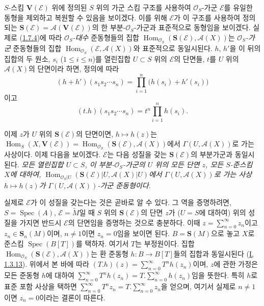 \begin{env}[1.7.14]
\label{II.1.7.14-ko}
$S$-스킴 $\mathbf{V}(\mathcal{E})$ 위에 정의된 $S$ 위의 가군 스킴
구조를 사용하여 $\mathcal{O}_S$-가군 $\mathcal{E}$를 유일한 동형을
제외하고 복원할 수 있음을 보이겠다. 이를 위해 $\mathcal{E}$가 이
구조를 사용하여 정의되는
$\mathbf{S}(\mathcal{E})=\mathcal{A}(\mathbf{V}(\mathcal{E}))$의 한
부분-$\mathcal{O}_S$-가군과 표준적으로 동형임을 보이겠다. 실제로
(\hyperref[II.1.7.4-ko]{1.7.4})에 따라
\emph{$\mathcal{O}_S$-대수} 준동형들의 집합
$\operatorname{Hom}_{\mathcal{O}_S}(\mathbf{S}(\mathcal{E}),
\mathcal{A}(X))$는 \emph{$\mathcal{O}_S$-가군} 준동형들의 집합
$\operatorname{Hom}_{\mathcal{O}_S}(\mathcal{E},\mathcal{A}(X))$와
표준적으로 동일시된다. $h$, $h'$을 이 뒤의 집합의 두 원소,
$s_i$ ($1\leq i\leq n$)를 열린집합 $U\subset S$ 위의
$\mathcal{E}$의 단면들, $t$를 $U$ 위의 $\mathcal{A}(X)$의 단면이라
하면, 정의에 따라
\[
  (h+h')(s_1s_2\cdots s_n)
  =\prod_{i=1}^n\bigl(h(s_i)+h'(s_i)\bigr)
\]
이고
\[
  (t.h)(s_1s_2\cdots s_n)=t^n\prod_{i=1}^n h(s_i).
\]

이제 $z$가 $U$ 위의 $\mathbf{S}(\mathcal{E})$의 단면이면,
$h\mapsto h(z)$는
$\operatorname{Hom}_S(X,\mathbf{V}(\mathcal{E}))
=\operatorname{Hom}_{\mathcal{O}_S}(\mathbf{S}(\mathcal{E}),
\mathcal{A}(X))$에서 $\Gamma(U,\mathcal{A}(X))$로 가는 사상이다.
이제 다음을
보이겠다. $\mathcal{E}$는 다음 성질을 갖는
$\mathbf{S}(\mathcal{E})$의 부분가군과 동일시된다.
\emph{모든 열린집합 $U\subset S$, 이 부분-$\mathcal{O}_S$-가군의
$U$ 위의 모든 단면 $z$, 모든 $S$-준스킴 $X$에 대하여,
$\operatorname{Hom}_{\mathcal{O}_S|U}(\mathbf{S}(\mathcal{E})|U,
\mathcal{A}(X)|U)$에서 $\Gamma(U,\mathcal{A}(X))$로 가는 사상
$h\mapsto h(z)$가 $\Gamma(U,\mathcal{A}(X))$-가군 준동형이다.}

실제로 $\mathcal{E}$가 이 성질을 갖는다는 것은 곧바로 알 수 있다.
그 역을 증명하려면, $S=\operatorname{Spec}(A)$,
$\mathcal{E}=\widetilde{M}$일 때 $S$ 위의
$\mathbf{S}(\mathcal{E})$의 단면 $z$가 ($U=S$에 대하여) 위의
성질을 가지면 반드시 $\mathcal{E}$의 단면임을 증명하는 것으로
충분하다. 이때 $z=\sum_{n=0}^{\infty}z_n$이고
$z_n\in\mathbf{S}_n(M)$이며, $n\ne1$이면 $z_n=0$임을 보이면 된다.
$B=\mathbf{S}(M)$으로 놓고 $X$로 준스킴
$\operatorname{Spec}(B[T])$를 택하자. 여기서 $T$는 부정원이다.
집합
$\operatorname{Hom}_{\mathcal{O}_S}(\mathbf{S}(\mathcal{E}),
\mathcal{A}(X))$는 환 준동형 $h:B\to B[T]$들의 집합과 동일시된다
(\hyperref[I.1.3.13-ko]{I, 1.3.13}). 위에서 본 바에 따라
$(T.h)(z)=\sum_{n=0}^{\infty}T^nh(z_n)$이며, $z$에 관한 가정은 모든
준동형 $h$에 대하여
$\sum_{n=0}^{\infty}T^nh(z_n)=T.\sum_{n=0}^{\infty}h(z_n)$임을
뜻한다. 특히 $h$로 표준 포함 사상을 택하면
$\sum_{n=0}^{\infty}T^nz_n=T.\sum_{n=0}^{\infty}z_n$을 얻으며,
여기서 실제로 $n\ne1$이면 $z_n=0$이라는 결론이 따른다.
\end{env}

